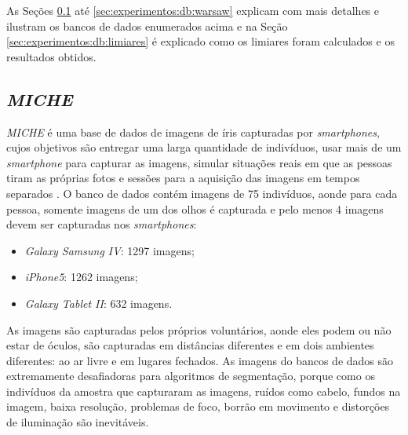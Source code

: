 
\par As Seções \ref{sec:experimentos:db:miche} até \ref{sec:experimentos:db:warsaw} explicam com mais detalhes e ilustram os bancos de dados enumerados acima e na Seção \ref{sec:experimentos:db:limiares} é explicado como os limiares foram calculados e os resultados obtidos.

\subsection{\textit{MICHE}}\label{sec:experimentos:db:miche}

\par \textit{MICHE} é uma base de dados de imagens de íris capturadas por \textit{smartphones}, cujos objetivos são entregar uma larga quantidade de indivíduos, usar mais de um \textit{smartphone} para capturar as imagens, simular situações reais em que as pessoas tiram as próprias fotos e sessões para a aquisição das imagens em tempos separados \cite{santada2016-MICHE-2}. O banco de dados contém imagens de 75 indivíduos, aonde para cada pessoa, somente imagens de um dos olhos é capturada e pelo menos 4 imagens devem ser capturadas nos \textit{smartphones}:

\begin{itemize}
    \item \textit{Galaxy Samsung IV}: 1297 imagens;
    \item \textit{iPhone5}: 1262 imagens;
    \item \textit{Galaxy Tablet II}: 632 imagens.
\end{itemize}

\par As imagens são capturadas pelos próprios voluntários, aonde eles podem ou não estar de óculos, são capturadas em distâncias diferentes e em dois ambientes diferentes: ao ar livre e em lugares fechados. As imagens do bancos de dados são extremamente desafiadoras para algoritmos de segmentação, porque como os indivíduos da amostra que capturaram as imagens, ruídos como cabelo, fundos na imagem, baixa resolução, problemas de foco, borrão em movimento e distorções de iluminação são inevitáveis.

